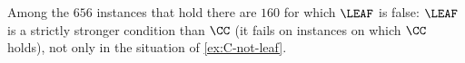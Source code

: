 


Among the $656$ instances that hold there are $160$ for which $\LEAF$ is false: $\LEAF$ is a strictly
stronger condition than $\CC$ (it fails on instances on which $\CC$ holds), not only in the situation
of \cref{ex:C-not-leaf}.



%


